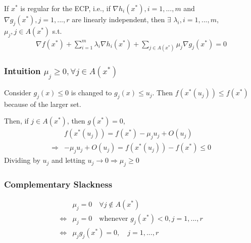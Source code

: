 \documentclass[11pt,a4paper]{article}
\begin{document}
If $x^*$ is regular for the ECP, i.e., if $\nabla h_i(x^*),i=1,...,m$ and $\nabla g_j(x^*),j=1,...,r$ are linearly independent, then $\exists$ $\lambda_i,i=1,...,m$, $\mu_j,j\in A(x^*)$ s.t.
\begin{equation}
    \begin{aligned}
        \nabla f(x^*)+\sum_{i=1}^m\lambda_i \nabla h_i(x^*)+\sum_{j\in A(x^*)}\mu_j \nabla g_j(x^*)=0
    \end{aligned}
    \nonumber
\end{equation}

\subsubsection{Intuition $\mu_j\geq 0, \forall j\in A(x^*)$}
Consider $g_j(x)\leq 0$ is changed to $g_j(x)\leq u_j$. Then $f(x^*(u_j))\leq f(x^*)$ because of the larger set.

Then, if $j\in A(x^*)$, then $g(x^*)=0$,
\begin{equation}
    \begin{aligned}
        &f(x^*(u_j))=f(x^*)-\mu_ju_j+O(u_j)\\
        \Rightarrow	& -\mu_j u_j+O(u_j)=f(x^*(u_j))-f(x^*)\leq 0
    \end{aligned}
    \nonumber
\end{equation}
Dividing by $u_j$ and letting $u_j \rightarrow 0 \Rightarrow \mu_j\geq 0$

\subsubsection{Complementary Slackness}
\begin{equation}
    \begin{aligned}
        &\mu_j=0\quad \forall j\notin A(x^*)\\
        \Leftrightarrow & \mu_j=0\quad \text{whenever }g_j(x^*)<0, j=1,...,r\\
        \Leftrightarrow & \mu_jg_j(x^*)=0,\quad j=1,...,r
    \end{aligned}
    \nonumber
\end{equation}
\end{document}
